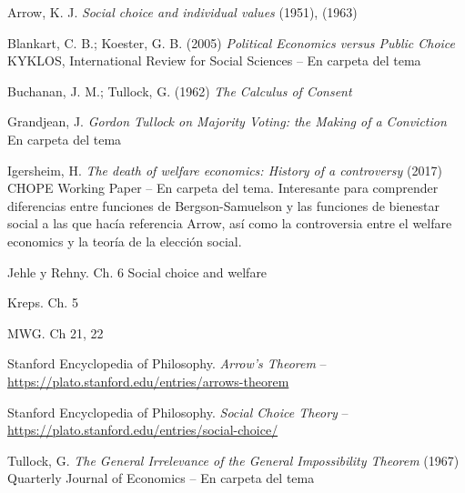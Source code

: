 \documentclass{nuevotema}
\begin{document}
Arrow, K. J. \textit{Social choice and individual values} (1951), (1963)

Blankart, C. B.; Koester, G. B. (2005) \textit{Political Economics versus Public Choice} KYKLOS, International Review for Social Sciences -- En carpeta del tema

Buchanan, J. M.; Tullock, G. (1962) \textit{The Calculus of Consent} 

Grandjean, J. \textit{Gordon Tullock on Majority Voting: the Making of a Conviction} En carpeta del tema

Igersheim, H. \textit{The death of welfare economics: History of a controversy} (2017) CHOPE Working Paper -- En carpeta del tema. Interesante para comprender diferencias entre funciones de Bergson-Samuelson y las funciones de bienestar social a las que hacía referencia Arrow, así como la controversia entre el welfare economics y la teoría de la elección social.

Jehle y Rehny. Ch. 6 Social choice and welfare

Kreps. Ch. 5

MWG. Ch 21, 22

Stanford Encyclopedia of Philosophy. \textit{Arrow's Theorem} -- \url{https://plato.stanford.edu/entries/arrows-theorem}

Stanford Encyclopedia of Philosophy. \textit{Social Choice Theory} -- \url{https://plato.stanford.edu/entries/social-choice/}

Tullock, G. \textit{The General Irrelevance of the General Impossibility Theorem} (1967) Quarterly Journal of Economics -- En carpeta del tema
\end{document}
